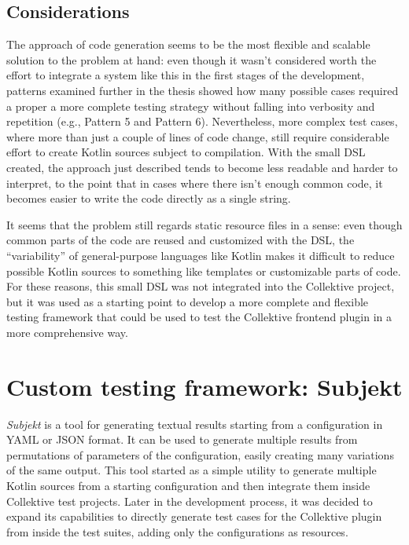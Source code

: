 \documentclass[12pt,a4paper,openright,twoside]{book}
\begin{document}
\subsection{Considerations}

The approach of code generation seems to be the most flexible and scalable 
solution to the problem at hand: even though it wasn't considered worth the 
effort to integrate a system like this in the first stages of the development,
patterns examined further in the thesis showed how many possible cases 
required a proper a more complete testing strategy without falling into
verbosity and repetition (e.g., Pattern 5 and Pattern 6).
%
Nevertheless, more complex test cases, where more than just a couple of lines of
code change, still require considerable effort to create Kotlin sources subject
to compilation. With the small \ac{DSL} created, the approach just described
tends to become less readable and harder to interpret, to the point that in
cases where there isn't enough common code, it becomes easier to write the code
directly as a single string.

It seems that the problem still regards static resource files in a sense: even
though common parts of the code are reused and customized with the \ac{DSL}, the
``variability'' of general-purpose languages like Kotlin makes it difficult to
reduce possible Kotlin sources to something like templates or customizable parts
of code.
%
For these reasons, this small \ac{DSL} was not integrated into the Collektive
project, but it was used as a starting point to develop a more complete and
flexible testing framework that could be used to test the Collektive frontend
plugin in a more comprehensive way. 

\section{Custom testing framework: Subjekt}

\emph{Subjekt} is a tool for generating textual results starting from a
configuration in YAML or JSON format. It can be used to generate multiple
results from permutations of parameters of the configuration, easily creating
many variations of the same output.
%
This tool started as a simple utility to generate multiple Kotlin sources from a
starting configuration and then integrate them inside Collektive test projects.
Later in the development process, it was decided to expand its capabilities to
directly generate test cases for the Collektive plugin from inside the test
suites, adding only the configurations as resources.
\end{document}
